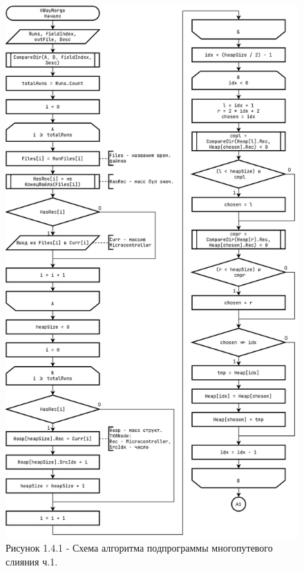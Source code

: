\documentclass[oneside,a4paper,14pt]{extarticle}
\begin{document}
\clearpage
\begin{figure}[H]
	\centering
	\includegraphics[height=0.9\textheight]{pics/flowchart4p1.png}
	\caption*{Рисунок 1.4.1 - Схема алгоритма подпрограммы многопутевого слияния ч.1.}
\end{figure}
\end{document}
